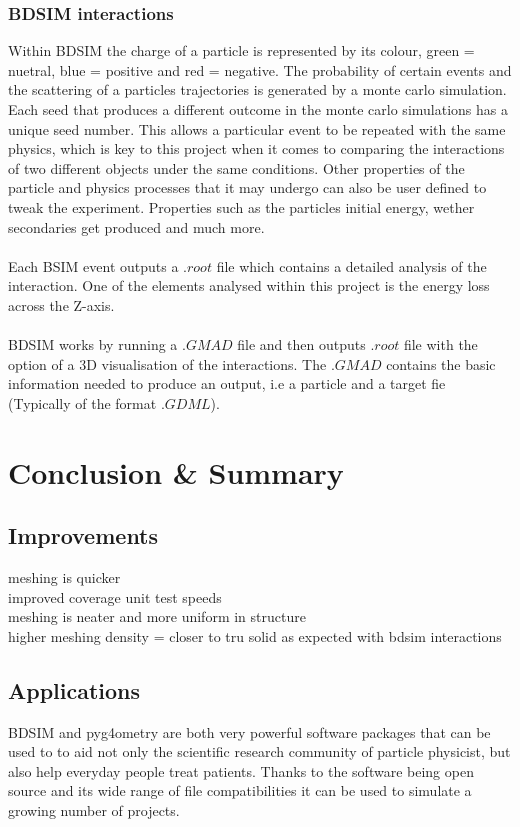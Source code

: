 \documentclass[12pt,a4paper]{article}
\begin{document}
\subsubsection{BDSIM interactions}
Within BDSIM the charge of a particle is represented by its colour, green = nuetral, blue = positive and red = negative. The probability of certain events and the scattering of a particles trajectories is generated by a monte carlo simulation. Each seed that produces a different outcome in the monte carlo simulations has a unique seed number. This allows a particular event to be repeated with the same physics, which is key to this project when it comes to comparing the interactions of two different objects under the same conditions. Other properties of the particle and physics processes that it may undergo can also be user defined to tweak the experiment. Properties such as the particles initial energy, wether secondaries get produced and much more.
\\\\
Each BSIM event outputs a $.root$ file which contains a detailed analysis of the interaction. One of the elements analysed within this project is the energy loss across the Z-axis.
\\\\
BDSIM works by running a $.GMAD$ file and then outputs $.root$ file with the option of a 3D visualisation of the interactions. The $.GMAD$ contains the basic information needed to produce an output, i.e a particle and a target fie (Typically of the format $.GDML$).

\newpage
\section{Conclusion \& Summary}
\label{conc}
\subsection{Improvements}
meshing is quicker\\
improved coverage unit test speeds\\
meshing is neater and more uniform in structure\\
higher meshing density = closer to tru solid as expected with bdsim interactions\\

\subsection{Applications}
BDSIM and pyg4ometry are both very powerful software packages that can be used to to aid not only the scientific research community of particle physicist, but also help everyday people treat patients. Thanks to the software being open source and its wide range of file compatibilities it can be used to simulate a growing number of projects.
\end{document}
